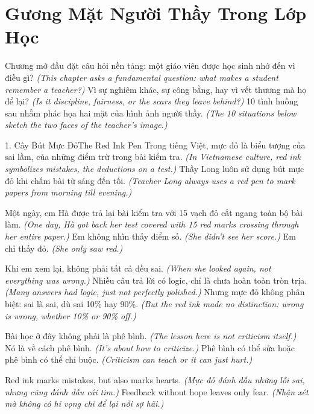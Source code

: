 \chapter{Gương Mặt Người Thầy Trong Lớp Học}

\begin{leadbox}
Chương mở đầu đặt câu hỏi nền tảng: một giáo viên được học sinh nhớ đến vì điều gì?
\textit{(This chapter asks a fundamental question: what makes a student remember a teacher?)}
Vì sự nghiêm khác, sự công bằng, hay vì vết thương mà họ để lại?
\textit{(Is it discipline, fairness, or the scars they leave behind?)}
10 tình huống sau nhằm phác họa hai mặt của hình ảnh người thầy.
\textit{(The 10 situations below sketch the two faces of the teacher's image.)}
\end{leadbox}

\begin{truyen}{1. Cây Bút Mực Đỏ}{The Red Ink Pen}
Trong tiếng Việt, mực đỏ là biểu tượng của sai lầm, của những điểm trừ trong bài kiểm tra.
\textit{(In Vietnamese culture, red ink symbolizes mistakes, the deductions on a test.)}
Thầy Long luôn sử dụng bút mực đỏ khi chấm bài từ sáng đến tối.
\textit{(Teacher Long always uses a red pen to mark papers from morning till evening.)}

Một ngày, em Hà được trả lại bài kiểm tra với 15 vạch đỏ cắt ngang toàn bộ bài làm.
\textit{(One day, Hà got back her test covered with 15 red marks crossing through her entire paper.)}
Em không nhìn thấy điểm số.
\textit{(She didn't see her score.)}
Em chỉ thấy đỏ.
\textit{(She only saw red.)}

Khi em xem lại, không phải tất cả đều sai.
\textit{(When she looked again, not everything was wrong.)}
Nhiều câu trả lời có logic, chỉ là chưa hoàn toàn tròn trịa.
\textit{(Many answers had logic, just not perfectly polished.)}
Nhưng mực đỏ không phân biệt: sai là sai, dù sai 10\% hay 90\%.
\textit{(But the red ink made no distinction: wrong is wrong, whether 10\% or 90\% off.)}

Bài học ở đây không phải là phê bình.
\textit{(The lesson here is not criticism itself.)}
Nó là về cách phê bình.
\textit{(It's about how to criticize.)}
Phê bình có thể sửa hoặc phê bình có thể chỉ buộc.
\textit{(Criticism can teach or it can just hurt.)}
\end{truyen}

\begin{ghinhoanh}
Red ink marks mistakes, but also marks hearts.
\textit{(Mực đỏ đánh dấu những lỗi sai, nhưng cũng đánh dấu cái tim.)}
Feedback without hope leaves only fear.
\textit{(Nhận xét mà không có hi vọng chỉ để lại nỗi sợ hãi.)}
\end{ghinhoanh}

